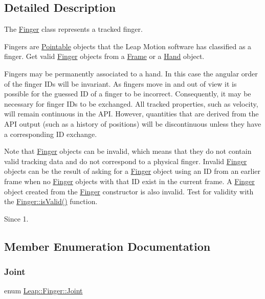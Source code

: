 \subsection{Detailed Description}
The \hyperlink{class_leap_1_1_finger}{Finger} class represents a tracked finger.

Fingers are \hyperlink{class_leap_1_1_pointable}{Pointable} objects that the Leap Motion software has classified as a finger. Get valid \hyperlink{class_leap_1_1_finger}{Finger} objects from a \hyperlink{class_leap_1_1_frame}{Frame} or a \hyperlink{class_leap_1_1_hand}{Hand} object.

Fingers may be permanently associated to a hand. In this case the angular order of the finger I\+Ds will be invariant. As fingers move in and out of view it is possible for the guessed ID of a finger to be incorrect. Consequently, it may be necessary for finger I\+Ds to be exchanged. All tracked properties, such as velocity, will remain continuous in the A\+PI. However, quantities that are derived from the A\+PI output (such as a history of positions) will be discontinuous unless they have a corresponding ID exchange.

Note that \hyperlink{class_leap_1_1_finger}{Finger} objects can be invalid, which means that they do not contain valid tracking data and do not correspond to a physical finger. Invalid \hyperlink{class_leap_1_1_finger}{Finger} objects can be the result of asking for a \hyperlink{class_leap_1_1_finger}{Finger} object using an ID from an earlier frame when no \hyperlink{class_leap_1_1_finger}{Finger} objects with that ID exist in the current frame. A \hyperlink{class_leap_1_1_finger}{Finger} object created from the \hyperlink{class_leap_1_1_finger}{Finger} constructor is also invalid. Test for validity with the \hyperlink{class_leap_1_1_pointable_afe50d02eb1b4f554a4089c329fda1a45}{Finger\+::is\+Valid()} function. \begin{DoxySince}{Since}
1. 
\end{DoxySince}


\subsection{Member Enumeration Documentation}
\mbox{\label{class_leap_1_1_finger_ac49e756a0440cb5b75a9ad7838f08137}} 
\subsubsection{\texorpdfstring{Joint}{Joint}}
{\footnotesize\ttfamily enum \hyperlink{class_leap_1_1_finger_ac49e756a0440cb5b75a9ad7838f08137}{Leap\+::\+Finger\+::\+Joint}}


